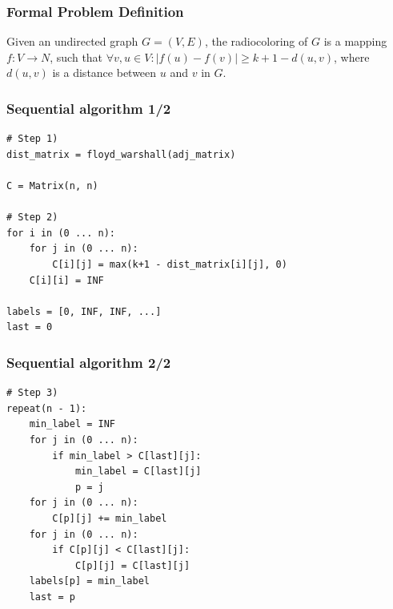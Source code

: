 \documentclass[11pt,xcolor=pdflatex]{beamer}
\begin{document}

\begin{frame}\frametitle{Formal Problem Definition}

Given an undirected graph $G = (V, E)$, the radiocoloring of $G$ is a mapping $f: V \rightarrow N$, such that $\forall v,u \in V: |f(u) - f(v)| \geq k + 1 - d(u,v)$, where $d(u,v)$ is a distance between $u$ and $v$ in $G$.

\end{frame}


\begin{frame}[fragile]\frametitle{Sequential algorithm 1/2}

\begin{lstlisting}
# Step 1)
dist_matrix = floyd_warshall(adj_matrix)

C = Matrix(n, n)

# Step 2)
for i in (0 ... n):
    for j in (0 ... n):
        C[i][j] = max(k+1 - dist_matrix[i][j], 0)
    C[i][i] = INF

labels = [0, INF, INF, ...]
last = 0
\end{lstlisting}

\end{frame}


\begin{frame}[fragile]\frametitle{Sequential algorithm 2/2}

\begin{lstlisting}
# Step 3)
repeat(n - 1):
    min_label = INF
    for j in (0 ... n):
        if min_label > C[last][j]:
            min_label = C[last][j]
            p = j
    for j in (0 ... n):
        C[p][j] += min_label
    for j in (0 ... n):
        if C[p][j] < C[last][j]:
            C[p][j] = C[last][j]
    labels[p] = min_label
    last = p
\end{lstlisting}

\end{frame}

\end{document}
